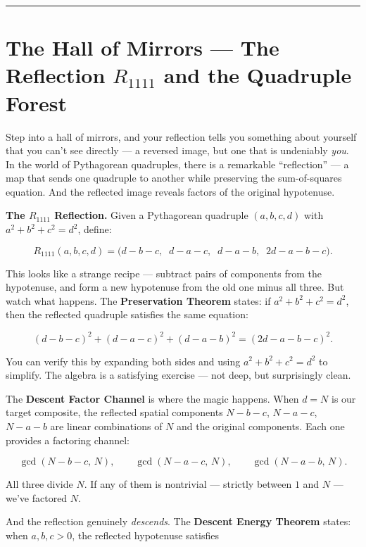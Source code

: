 \bigskip\noindent\rule{\linewidth}{0.4pt}\bigskip

\section{\texorpdfstring{The Hall of Mirrors --- The Reflection \(R_{1111}\) and the Quadruple Forest}{The Hall of Mirrors --- The Reflection R\_\{1111\} and the Quadruple Forest}}
Step into a hall of mirrors, and your reflection tells you something about yourself that you can't see directly --- a reversed image, but one that is undeniably \emph{you}. In the world of Pythagorean quadruples, there is a remarkable ``reflection'' --- a map that sends one quadruple to another while preserving the sum-of-squares equation. And the reflected image reveals factors of the original hypotenuse.

\textbf{The \(R_{1111}\) Reflection.} Given a Pythagorean quadruple \((a, b, c, d)\) with \(a^2 + b^2 + c^2 = d^2\), define:

\[R_{1111}(a, b, c, d) = \big(d - b - c,\;\; d - a - c,\;\; d - a - b,\;\; 2d - a - b - c\big).\]

This looks like a strange recipe --- subtract pairs of components from the hypotenuse, and form a new hypotenuse from the old one minus all three. But watch what happens. The \textbf{Preservation Theorem} states: if \(a^2 + b^2 + c^2 = d^2\), then the reflected quadruple satisfies the same equation:

\[(d - b - c)^2 + (d - a - c)^2 + (d - a - b)^2 = (2d - a - b - c)^2.\]

You can verify this by expanding both sides and using \(a^2 + b^2 + c^2 = d^2\) to simplify. The algebra is a satisfying exercise --- not deep, but surprisingly clean.

The \textbf{Descent Factor Channel} is where the magic happens. When \(d = N\) is our target composite, the reflected spatial components \(N - b - c\), \(N - a - c\), \(N - a - b\) are linear combinations of \(N\) and the original components. Each one provides a factoring channel:

\[\gcd(N - b - c, \, N), \qquad \gcd(N - a - c, \, N), \qquad \gcd(N - a - b, \, N).\]

All three divide \(N\). If any of them is nontrivial --- strictly between \(1\) and \(N\) --- we've factored \(N\).

And the reflection genuinely \emph{descends}. The \textbf{Descent Energy Theorem} states: when \(a, b, c > 0\), the reflected hypotenuse satisfies

